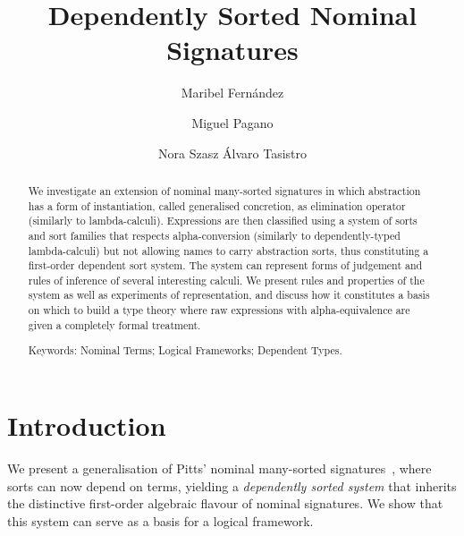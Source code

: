 \documentclass[copyright,creativecommons]{eptcs}
\newcounter{s}
\begin{document}
%
\title{Dependently Sorted Nominal Signatures}
\author{Maribel Fernández 
\and Miguel Pagano
\and Nora Szasz \qquad Álvaro Tasistro
}

\def\titlerunning{}
\def\authorrunning{M. Fernández, M. Pagano, N. Szasz, A. Tasistro}
\def\copyrightholders{Fernández, Pagano, Szasz, Tasistro}

%
\maketitle
%
\begin{abstract}
  We investigate an extension of 
  nominal many-sorted signatures in which abstraction has a form of instantiation, called generalised concretion, as elimination operator (similarly to lambda-calculi). 
  Expressions are then classified using a system of sorts and sort families that respects alpha-conversion (similarly to dependently-typed lambda-calculi) but
  not allowing names to carry abstraction sorts, thus constituting a first-order dependent sort system. 
  The system can represent forms of judgement and rules of inference of several interesting calculi. 
  We present rules and properties of the system as well as experiments of representation, and discuss how it constitutes a basis on which to build a type theory where raw expressions with alpha-equivalence are given a completely formal treatment.

\noindent
  Keywords: {Nominal Terms; Logical Frameworks; Dependent Types.}
\end{abstract}
%
\section{Introduction}

We present a generalisation of Pitts' nominal many-sorted signatures~\cite{pitts:alpsri}, where sorts can now depend on terms, yielding a \emph{dependently sorted system} that inherits the distinctive first-order algebraic flavour of nominal signatures.
We show that this system can serve as a basis for a logical framework.
\end{document}
